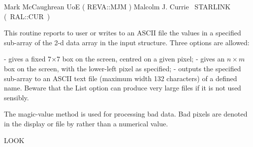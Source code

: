 {\begin{manroutinedescription}
  Mark McCaughrean UoE ( {\mantt REVA}::{\mantt MJM} )
  Malcolm J. Currie ~STARLINK \mbox{( {\mantt RAL}::{\mantt CUR} )}
\end{manroutinedescription}

\begin{manroutinedescription}
  This routine reports to user or writes to an ASCII file the values
  in a specified sub-array of the 2-d data array in the input {}
  structure. Three options are allowed:
\begin{mandescription}
  - gives a fixed 7{$\times$}7 box on the screen, centred
  on a given pixel;
 - gives an {$n\times m$} box on the screen, with the
  lower-left pixel as specified;
  - outputs the specified sub-array to an
  ASCII text file (maximum width 132 characters) of a defined
  name.  Beware that the List option can produce very
  large files if it is not used sensibly.

\end{mandescription}
  The magic-value method is used for processing bad data. Bad pixels
  are denoted in the display or file by {} rather than a
  numerical value.

  LOOK


\end{manroutinedescription}}
